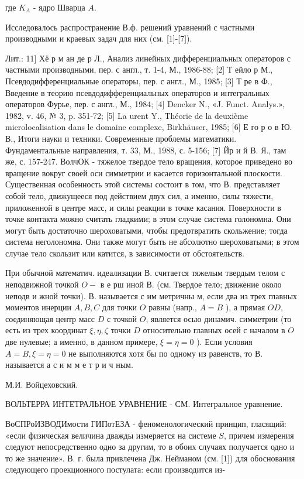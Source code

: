 \documentclass[10pt]{article}
\begin{document}
где $K_{A}$ - ядро Шварца $A$.



Исследовалось распространение В.ф. решений уравнений с частными производными и краевых задач для них (см. [1]-[7]).



Лит.: 11] Хё р м ан де р Л., Анализ линейных дифференциальных операторов с частными производными, пер. с англ., т. 1-4, М., 1986-88; [2] Т ейло р М., Псевдодифференциальные операторы, пер. с англ., М., 1985; [3] Т ре в Ф., Введение в теорию псевдодифференциальных операторов и интегральных операторов Фурье, пер. с англ., М., 1984; [4] Dencker N., «J. Funct. Analys.», 1982, v. 46, № 3, p. 351-72; [5] La urent Y., Théorie de la deuxième microlocalisation dans le domaine complexe, Birkhäuser, 1985; [6] Е го р о в Ю. В., Итоги науки и техники. Современные проблемы математики. Фундаментальные направления, т. 33, М., 1988, с. 5-156; [7] Йр и й В. Я., там же, с. 157-247. ВолчОК - тяжелое твердое тело вращения, которое приведено во вращение вокруг своей оси симметрии и касается горизонтальной плоскости. Существенная особенность этой системы состоит в том, что В. представляет собой тело, движущееся под действием двух сил, а именно, силы тяжести, приложенной в центре масс, и силы реакции в точке касания. Поверхности в точке контакта можно считать гладкими; в этом случае система голономна. Они могут быть достаточно шероховатыми, чтобы предотвратить скольжение; тогда система неголономна. Они также могут быть не абсолютно шероховатыми; в этом случае тело скользит или катится, в зависимости от обстоятельств.



При обычной математич. идеализации В. считается тяжелым твердым телом с неподвижной точкой $O-$ в е рш иной В. (см. Твердое тело; движение около неподв и жной точки). В. называется с им метричны м, если два из трех главных моментов инерции $A, B, C$ для точки $O$ равны (напр., $A=B$ ), а прямая $O D$, соединяющая центр масс $D$ с точкой $O$, является осью динамич. симметрии (то есть из трех координат $\xi, \eta, \zeta$ точки $D$ относительно главных осей с началом в $O$ две нулевые; а именно, в данном примере, $\xi=\eta=0$ ). Если условия $A=B, \xi=\eta=0$ не выполняются хотя бы по одному из равенств, то В. называется а с и м м е т р и ч ным.



М.И. Войцеховский.



ВОЛЬТЕРРА ИНТЕТРАЛЬНОЕ УРАВНЕНИЕ - СМ. Интегральное уравнение.



ВоСПРоИЗВОДИмости ГИПотЕЗА - феноменологический принцип, гласящий: «если физическая величина дважды измеряется на системе $S$, причем измерения следуют непосредственно одно за другим, то в обоих случаях получается одно и то же значение». В. г. была привлечена Дж. Нейманом (см. [1]) для обоснования следующего проекционного постулата: если производится из-
\end{document}
